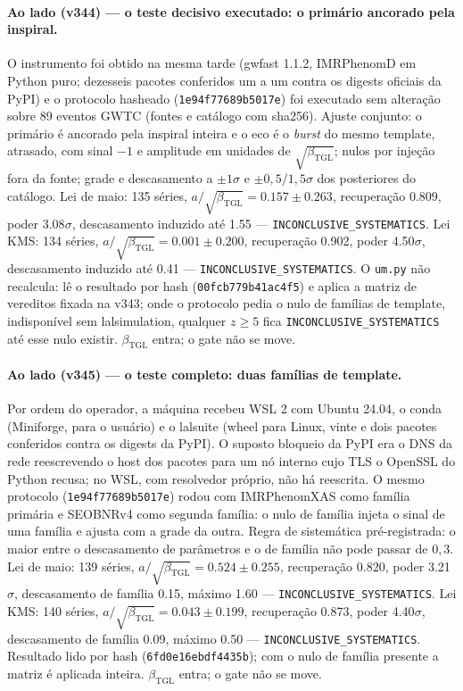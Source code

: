 \documentclass[11pt]{article}
\newcommand{\bTGL}{\beta_{\mathrm{TGL}}}\newcommand{\Msun}{M_{\odot}}\newcommand{\TGL}{\mathrm{TGL}}
\theoremstyle{definition}\newtheorem{deriv}{Derivação}
\begin{document}
\paragraph*{Ao lado (v344) --- o teste decisivo executado: o primário ancorado pela inspiral.} O instrumento foi obtido na mesma tarde (gwfast 1.1.2, IMRPhenomD em Python puro; dezesseis pacotes conferidos um a um contra os digests oficiais da PyPI) e o protocolo hasheado (\texttt{1e94f77689b5017e}) foi executado sem alteração sobre 89 eventos GWTC (fontes e catálogo com sha256). Ajuste conjunto: o primário é ancorado pela inspiral inteira e o eco é o \emph{burst} do mesmo template, atrasado, com sinal $-1$ e amplitude em unidades de $\sqrt{\bTGL}$; nulos por injeção fora da fonte; grade e descasamento a $\pm1\sigma$ e $\pm0{,}5/1{,}5\sigma$ dos posteriores do catálogo. Lei de maio: 135 séries, $a/\sqrt{\bTGL}=0.157\pm0.263$, recuperação 0.809, poder 3.08$\sigma$, descasamento induzido até 1.55 --- \texttt{INCONCLUSIVE\_SYSTEMATICS}. Lei KMS: 134 séries, $a/\sqrt{\bTGL}=0.001\pm0.200$, recuperação 0.902, poder 4.50$\sigma$, descasamento induzido até 0.41 --- \texttt{INCONCLUSIVE\_SYSTEMATICS}. O \texttt{um.py} não recalcula: lê o resultado por hash (\texttt{00fcb779b41ac4f5}) e aplica a matriz de vereditos fixada na v343; onde o protocolo pedia o nulo de famílias de template, indisponível sem lalsimulation, qualquer $z\geq5$ fica \texttt{INCONCLUSIVE\_SYSTEMATICS} até esse nulo existir. $\bTGL$ entra; o gate não se move.

\paragraph*{Ao lado (v345) --- o teste completo: duas famílias de template.} Por ordem do operador, a máquina recebeu WSL 2 com Ubuntu 24.04, o conda (Miniforge, para o usuário) e o lalsuite (wheel para Linux, vinte e dois pacotes conferidos contra os digests da PyPI). O suposto bloqueio da PyPI era o DNS da rede reescrevendo o host dos pacotes para um nó interno cujo TLS o OpenSSL do Python recusa; no WSL, com resolvedor próprio, não há reescrita. O mesmo protocolo (\texttt{1e94f77689b5017e}) rodou com IMRPhenomXAS como família primária e SEOBNRv4 como segunda família: o nulo de família injeta o sinal de uma família e ajusta com a grade da outra. Regra de sistemática pré-registrada: o maior entre o descasamento de parâmetros e o de família não pode passar de $0{,}3$. Lei de maio: 139 séries, $a/\sqrt{\bTGL}=0.524\pm0.255$, recuperação 0.820, poder 3.21$\sigma$, descasamento de família 0.15, máximo 1.60 --- \texttt{INCONCLUSIVE\_SYSTEMATICS}. Lei KMS: 140 séries, $a/\sqrt{\bTGL}=0.043\pm0.199$, recuperação 0.873, poder 4.40$\sigma$, descasamento de família 0.09, máximo 0.50 --- \texttt{INCONCLUSIVE\_SYSTEMATICS}. Resultado lido por hash (\texttt{6fd0e16ebdf4435b}); com o nulo de família presente a matriz é aplicada inteira. $\bTGL$ entra; o gate não se move.
\end{document}
